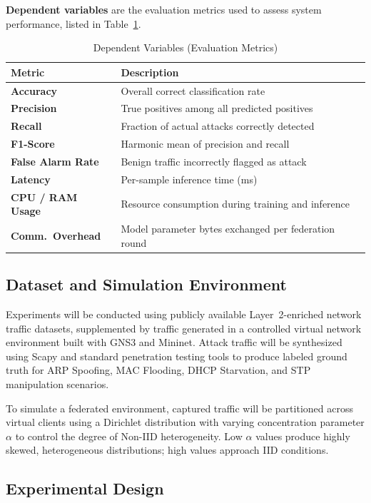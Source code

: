 \documentclass[conference]{IEEEtran}
\begin{document}
\textbf{Dependent variables} are the evaluation metrics used to assess system
performance, listed in Table~\ref{tab:depvars}.

\begin{table}[htbp]
\caption{Dependent Variables (Evaluation Metrics)}
\label{tab:depvars}
\renewcommand{\arraystretch}{1.2}
\begin{tabular}{>{\bfseries}p{2.2cm} p{5.3cm}}
\toprule
Metric & Description \\
\midrule
Accuracy          & Overall correct classification rate \\
Precision         & True positives among all predicted positives \\
Recall            & Fraction of actual attacks correctly detected \\
F1-Score          & Harmonic mean of precision and recall \\
False Alarm Rate  & Benign traffic incorrectly flagged as attack \\
Latency           & Per-sample inference time (ms) \\
CPU / RAM Usage   & Resource consumption during training and inference \\
Comm.\ Overhead   & Model parameter bytes exchanged per federation round \\
\bottomrule
\end{tabular}
\end{table}

\subsection{Dataset and Simulation Environment}

Experiments will be conducted using publicly available Layer~2-enriched network
traffic datasets, supplemented by traffic generated in a controlled virtual network
environment built with GNS3 and Mininet. Attack traffic will be synthesized using
Scapy and standard penetration testing tools to produce labeled ground truth for ARP
Spoofing, MAC Flooding, DHCP Starvation, and STP manipulation scenarios.

To simulate a federated environment, captured traffic will be partitioned across
virtual clients using a Dirichlet distribution with varying concentration parameter
$\alpha$ to control the degree of Non-IID heterogeneity. Low $\alpha$ values produce
highly skewed, heterogeneous distributions; high values approach IID conditions.

\subsection{Experimental Design}
\end{document}
